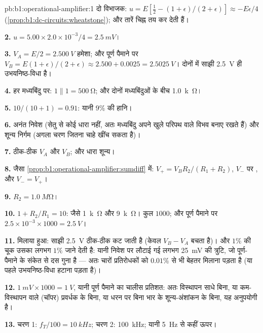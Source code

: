 \begin{solution}{pb:b1:operational-amplifier:1}
दो विभाजक: $u = E[\tfrac12 - (1 + \epsilon)/(2 + \epsilon)]
\approx -E\epsilon/4$ (\cref{prop:b1:dc-circuits:wheatstone}); और तारें
चिह्न तय कर देती हैं।

\textbf{2.} $u = 5.00 \times 2.0\times10^{-3}/4 = \qty{2.5}{mV}$।

\textbf{3.} $V_A = E/2 = \qty{2.500}{V}$ हमेशा; और पूर्ण पैमाने पर $V_B = E(1 + \epsilon)/(2 +
\epsilon) \approx 2.500 + 0.0025 = \qty{2.5025}{V}$। दोनों में साझी
\qty{2.5}{V} ही उभयनिष्ठ-विधा  है।

\textbf{4.} हर मध्यबिंदु पर: $1 \parallel 1 = \qty{500}{\ohm}$; और दोनों
मध्यबिंदुओं के बीच \qty{1.0}{k\ohm}।

\textbf{5.} $10/(10 + 1) = 0.91$: यानी $9\%$ की हानि।

\textbf{6.} अनंत निवेश  (सेतु से कोई धारा नहीं, अतः
मध्यबिंदु अपने खुले परिपथ वाले विभव बनाए रखते हैं) और शून्य निर्गम
 (अगला चरण जितना चाहे खींच सकता है)।

\textbf{7.} ठीक-ठीक $V_A$ और $V_B$; और धारा शून्य।

\textbf{8.} जैसा \cref{prop:b1:operational-amplifier:sumdiff} में: $V_+ =
V_BR_2/(R_1 + R_2)$, $V_-$ पर , और $V_- = V_+$।

\textbf{9.} $R_2 = \qty{1.0}{M\ohm}$।

\textbf{10.} $1 + R_2/R_1 = 10$: जैसे \qty{1}{k\ohm} और \qty{9}{k\ohm}।
कुल  $1000$; और पूर्ण पैमाने पर $2.5 \times 10^{-3} \times 1000 = \qty{2.5}{V}$।

\textbf{11.} मिलाया हुआ: साझी \qty{2.5}{V} ठीक-ठीक कट जाती है (केवल
$V_B - V_A$ बचता है)। और $1\%$ की चूक उसका लगभग $1\%$ जाने देती है: यानी
निवेश पर लौटाई गई लगभग \qty{25}{mV} की त्रुटि, जो पूर्ण-पैमाने के संकेत से
दस गुना है --- अतः चारों प्रतिरोधकों को $0.01\%$ से भी बेहतर मिलाना पड़ता है
(या पहले उभयनिष्ठ-विधा  हटाना पड़ता है)।

\textbf{12.} $1\ \unit{mV} \times 1000 = \qty{1}{V}$, यानी पूर्ण पैमाने का
चालीस प्रतिशत: अतः विस्थापन साधे बिना, या कम-विस्थापन वाले (चॉपर)
प्रवर्धक के बिना, या धरन पर बिना भार के शून्य-अंशांकन के बिना, यह अनुपयोगी है।

\textbf{13.} चरण 1: $f_T/100 = \qty{10}{kHz}$; चरण 2: \qty{100}{kHz};
यानी \qty{5}{Hz} से कहीं ऊपर।


\end{solution}
